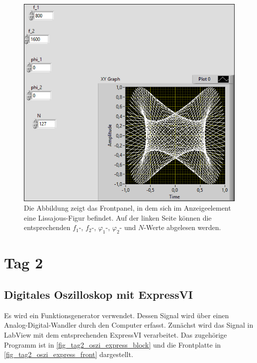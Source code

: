 \documentclass[
a4paper,
12pt,
pagesize,
ngerman
]{scrartcl}
\begin{document}
	\begin{figure}[h]
		\centering
		\includegraphics[width=1.0\textwidth]{EIRE2018Dateien/Tag1/lissajous-bilder/Lissajousp}
		\caption{Die Abbildung zeigt das Frontpanel, in dem sich im Anzeigeelement eine Lissajous-Figur befindet. Auf der linken Seite können die entsprechenden $f_1$-, $f_2$-, $\varphi_1$-, $\varphi_2$- und $N$-Werte abgelesen werden.}
		\label{lissajous}
		\centering
	\end{figure}
	
	\section{Tag 2}
	
	\subsection{Digitales Oszilloskop mit ExpressVI}
	Es wird ein Funktionsgenerator verwendet.
	Dessen Signal wird über einen Analog-Digital-Wandler durch den Computer erfasst.
	Zunächst wird das Signal in LabView mit dem entsprechenden ExpressVI verarbeitet.
	Das zugehörige Programm ist in \cref{fig_tag2_oszi_express_block} und die Frontplatte in \cref{fig_tag2_oszi_express_front} dargestellt.
	
\end{document}
